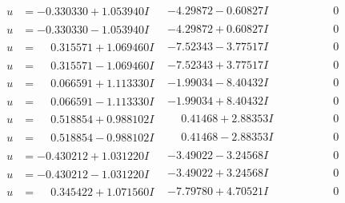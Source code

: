 \documentclass[1p]{elsarticle_modified}
\theoremstyle{definition}
\begin{document}
$$\begin{array}{c|c|c}
\begin{aligned}
u &= -0.330330 + 1.053940 I\end{aligned}
 & -4.29872 - 0.60827 I & \phantom{-0.000000 } 0 \\ \hline\begin{aligned}
u &= -0.330330 - 1.053940 I\end{aligned}
 & -4.29872 + 0.60827 I & \phantom{-0.000000 } 0 \\ \hline\begin{aligned}
u &= \phantom{-}0.315571 + 1.069460 I\end{aligned}
 & -7.52343 - 3.77517 I & \phantom{-0.000000 } 0 \\ \hline\begin{aligned}
u &= \phantom{-}0.315571 - 1.069460 I\end{aligned}
 & -7.52343 + 3.77517 I & \phantom{-0.000000 } 0 \\ \hline\begin{aligned}
u &= \phantom{-}0.066591 + 1.113330 I\end{aligned}
 & -1.99034 - 8.40432 I & \phantom{-0.000000 } 0 \\ \hline\begin{aligned}
u &= \phantom{-}0.066591 - 1.113330 I\end{aligned}
 & -1.99034 + 8.40432 I & \phantom{-0.000000 } 0 \\ \hline\begin{aligned}
u &= \phantom{-}0.518854 + 0.988102 I\end{aligned}
 & \phantom{-}0.41468 + 2.88353 I & \phantom{-0.000000 } 0 \\ \hline\begin{aligned}
u &= \phantom{-}0.518854 - 0.988102 I\end{aligned}
 & \phantom{-}0.41468 - 2.88353 I & \phantom{-0.000000 } 0 \\ \hline\begin{aligned}
u &= -0.430212 + 1.031220 I\end{aligned}
 & -3.49022 - 3.24568 I & \phantom{-0.000000 } 0 \\ \hline\begin{aligned}
u &= -0.430212 - 1.031220 I\end{aligned}
 & -3.49022 + 3.24568 I & \phantom{-0.000000 } 0 \\ \hline\begin{aligned}
u &= \phantom{-}0.345422 + 1.071560 I\end{aligned}
 & -7.79780 + 4.70521 I & \phantom{-0.000000 } 0 \\ \hline\begin{aligned}

\end{aligned}
\end{array}$$
\end{document}
